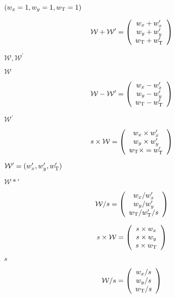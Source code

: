 \documentclass{article}
\begin{document}
$ (w_{x} = 1, w_{y} = 1, w_{\rm T} = 1) $
\pagebreak

\[ \mathcal{W} + \mathcal{W}^{\prime} = \left(\begin{array}{c} w_{x} + w_{x}^{\prime} \\ w_{y} + w_{y}^{\prime} \\ w_{\rm T} + w_{\rm T}^{\prime} \end{array} \right) \]
\pagebreak

$ \mathcal{W}, \mathcal{W}^{\prime} $
\pagebreak

$ \mathcal{W} $
\pagebreak

\[ \mathcal{W} - \mathcal{W}^{\prime} = \left(\begin{array}{c} w_{x} - w_{x}^{\prime} \\ w_{y} - w_{y}^{\prime} \\ w_{\rm T} - w_{\rm T}^{\prime} \end{array} \right) \]
\pagebreak

$ \mathcal{W}^{\prime} $
\pagebreak

\[ s \times \mathcal{W} = \left( \begin{array}{c} w_{x} \times w_{x}^{\prime} \\ w_{y} \times w_{y}^{\prime} \\ w_{\rm T} \times = w_{\rm T}^{\prime} \end{array} \right) \]
\pagebreak

$ \mathcal{W}^{\prime} = (w_{x}^{\prime},w_{y}^{\prime},w_{\rm T}^{\prime}) $
\pagebreak

$ \mathcal{W}*{\prime} $
\pagebreak

\[ \mathcal{W} / s = \left( \begin{array}{c} w_{x} / w_{x}^{\prime} \\ w_{y} / w_{y}^{\prime} \\ w_{\rm T} / w_{\rm T}^{\prime} / s \end{array} \right) \]
\pagebreak

\[ s \times \mathcal{W} = \left( \begin{array}{c} s \times w_{x} \\ s \times w_{y} \\ s \times w_{\rm T} \end{array} \right) \]
\pagebreak

$ s $
\pagebreak

\[ \mathcal{W} / s = \left( \begin{array}{c} w_{x} / s \\ w_{y} / s \\ w_{\rm T} / s \end{array} \right) \]
\pagebreak
\end{document}
